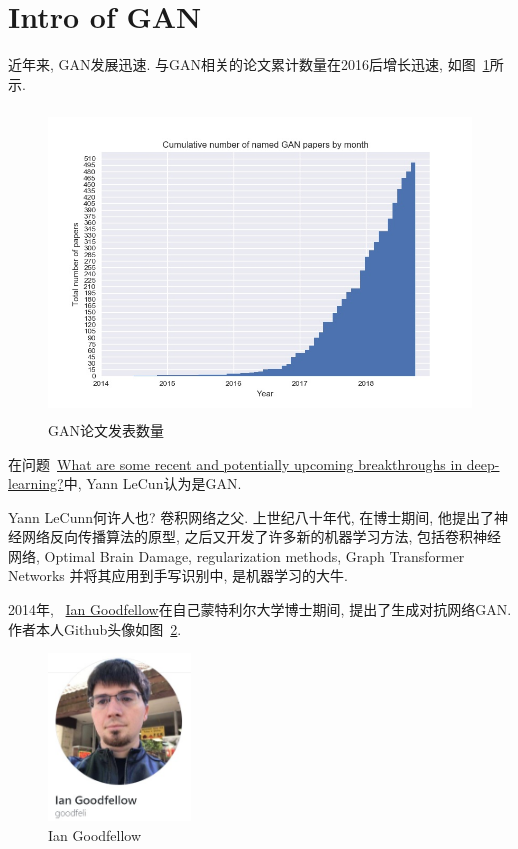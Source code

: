\section{Intro of GAN}

近年来, GAN发展迅速. 与GAN相关的论文累计数量在2016后增长迅速, 如图~\ref{fig:0101}所示. 
\begin{figure}[!htbp]
    \centering
    \includegraphics[height=22em]{pic/pic0101.jpg}
    \caption{GAN论文发表数量}
    \label{fig:0101}
\end{figure}

在问题~\href{https://www.quora.com/What-are-some-recent-and-potentially-upcoming-breakthroughs-in-deep-learning}{What are some recent and potentially upcoming breakthroughs in deep-learning?}中, Yann LeCun认为是GAN. 

Yann LeCunn何许人也? 卷积网络之父. 上世纪八十年代, 在博士期间, 他提出了神经网络反向传播算法的原型, 之后又开发了许多新的机器学习方法, 包括卷积神经网络, Optimal Brain Damage, regularization methods, Graph Transformer Networks 并将其应用到手写识别中, 是机器学习的大牛.

2014年, ~\href{https://github.com/goodfeli}{Ian Goodfellow}在自己蒙特利尔大学博士期间, 提出了生成对抗网络GAN. 作者本人Github头像如图~\ref{fig:0103}. 

\begin{figure}[!htbp]
    \centering
    \includegraphics[height=12em]{pic/cover.jpg}
    \caption{Ian Goodfellow}
    \label{fig:0103}
\end{figure}



